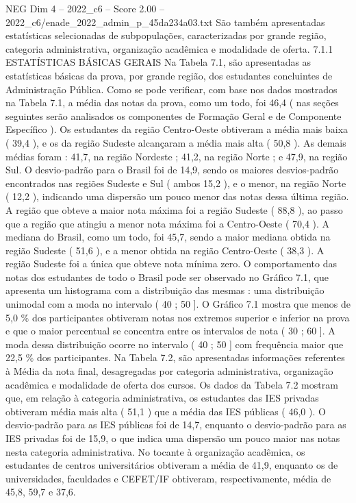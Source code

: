 \begin{textsample}{NEG Dim 4 – 2022\_c6 – Score 2.00 – 2022\_c6/enade\_2022\_admin\_p\_45da234a03.txt}
São também apresentadas estatísticas selecionadas de subpopulações, caracterizadas por grande região, categoria administrativa, organização acadêmica e modalidade de oferta. 7.1.1 ESTATÍSTICAS BÁSICAS GERAIS Na Tabela 7.1, são apresentadas as estatísticas básicas da prova, por grande região, dos estudantes concluintes de Administração Pública.
Como se pode verificar, com base nos dados mostrados na Tabela 7.1, a média das notas da prova, como um todo, foi 46,4 ( nas seções seguintes serão analisados os componentes de Formação Geral e de Componente Específico ).
Os estudantes da região Centro-Oeste obtiveram a média mais baixa ( 39,4 ), e os da região Sudeste alcançaram a média mais alta ( 50,8 ).
As demais médias foram : 41,7, na região Nordeste ; 41,2, na região Norte ; e 47,9, na região Sul.
O desvio-padrão para o Brasil foi de 14,9, sendo os maiores desvios-padrão encontrados nas regiões Sudeste e Sul ( ambos 15,2 ), e o menor, na região Norte ( 12,2 ), indicando uma dispersão um pouco menor das notas dessa última região.
A região que obteve a maior nota máxima foi a região Sudeste ( 88,8 ), ao passo que a região que atingiu a menor nota máxima foi a Centro-Oeste ( 70,4 ).
A mediana do Brasil, como um todo, foi 45,7, sendo a maior mediana obtida na região Sudeste ( 51,6 ), e a menor obtida na região Centro-Oeste ( 38,3 ).
A região Sudeste foi a única que obteve nota mínima zero.
O comportamento das notas dos estudantes de todo o Brasil pode ser observado no Gráfico 7.1, que apresenta um histograma com a distribuição das mesmas : uma distribuição unimodal com a moda no intervalo ( 40 ; 50 ].
O Gráfico 7.1 mostra que menos de 5,0 \% dos participantes obtiveram notas nos extremos superior e inferior na prova e que o maior percentual se concentra entre os intervalos de nota ( 30 ; 60 ].
A moda dessa distribuição ocorre no intervalo ( 40 ; 50 ] com frequência maior que 22,5 \% dos participantes.
Na Tabela 7.2, são apresentadas informações referentes à Média da nota final, desagregadas por categoria administrativa, organização acadêmica e modalidade de oferta dos cursos.
Os dados da Tabela 7.2 mostram que, em relação à categoria administrativa, os estudantes das IES privadas obtiveram média mais alta ( 51,1 ) que a média das IES públicas ( 46,0 ).
O desvio-padrão para as IES públicas foi de 14,7, enquanto o desvio-padrão para as IES privadas foi de 15,9, o que indica uma dispersão um pouco maior nas notas nesta categoria administrativa.
No tocante à organização acadêmica, os estudantes de centros universitários obtiveram a média de 41,9, enquanto os de universidades, faculdades e CEFET/IF obtiveram, respectivamente, média de 45,8, 59,7 e 37,6.

\end{textsample}

